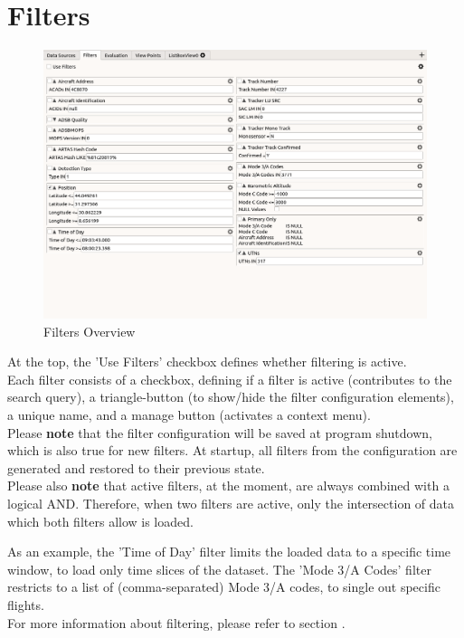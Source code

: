 \section{Filters}
\label{sec:ui_filters}

\begin{figure}[H]
    \hspace*{-2.5cm}
    \includegraphics[width=19cm,frame]{figures/ui_filters.png}
  \caption{Filters Overview}
\end{figure}

At the top, the 'Use Filters' checkbox defines whether filtering is active. \\

Each filter consists of a checkbox, defining if a filter is active (contributes to the search query), a triangle-button (to show/hide the filter configuration elements), a unique name, and a manage button (activates a context menu). \\

Please \textbf{note} that the filter configuration will be saved at program shutdown, which is also true for new filters. At startup,  all filters from the configuration are generated and restored to their previous state. \\

Please also \textbf{note} that active filters, at the moment, are always combined with a logical AND. Therefore, when two filters  are active, only the intersection of data which both filters allow is loaded.

As an example, the 'Time of Day' filter limits the loaded data to a specific time window, to load only time slices of the dataset.  The 'Mode 3/A Codes' filter restricts to a list of (comma-separated) Mode 3/A codes, to single out specific flights. \\

For more information about filtering, please refer to section .
 
